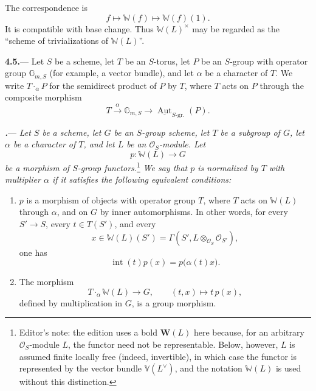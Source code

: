 The correspondence is
\[
  f\longmapsto\mathbb W(f)\longmapsto\mathbb W(f)(1).
\]
It is compatible with base change.  Thus
\(\mathbb W(L)^\times\) may be regarded as the ``scheme of
trivializations of \(\mathbb W(L)\)''.



\par\medskip\noindent
\textbf{4.5.}---
Let \(S\) be a scheme, let \(T\) be an \(S\)-torus, let \(P\) be an
\(S\)-group with operator group \(\mathbb G_{m,S}\)
\textup{(for example, a vector bundle)}, and let \(\alpha\) be a
character of \(T\).  We write \(T\mathbin{\cdot_\alpha}P\) for the
semidirect product of \(P\) by \(T\), where \(T\) acts on \(P\)
through the composite morphism
\[
  T
  \xrightarrow{\ \alpha\ }
  \mathbb G_{m,S}
  \longrightarrow
  \underline{\operatorname{Aut}}_{S\text{-gr.}}(P).
\]

\par\medskip\noindent
{}\textbf{\textit{.}}---
\textit{Let \(S\) be a scheme, let \(G\) be an \(S\)-group scheme,
let \(T\) be a subgroup of \(G\), let \(\alpha\) be a character of
\(T\), and let \(L\) be an \(\mathcal O_S\)-module.  Let}
\[
  p\colon\mathbb W(L)\longrightarrow G
\]
\textit{be a morphism of \(S\)-group functors.}\footnote{Editor's
note: the edition uses a bold \(\mathbf W(L)\) here because, for an
arbitrary \(\mathcal O_S\)-module \(L\), the functor need not be
representable.  Below, however, \(L\) is assumed finite locally free
\textup{(indeed, invertible)}, in which case the functor is
represented by the vector bundle \(\mathbb V(L^\vee)\), and the
notation \(\mathbb W(L)\) is used without this distinction.}
\textit{We say that \(p\) is \emph{normalized by \(T\) with
multiplier \(\alpha\)} if it satisfies the following equivalent
conditions:}

\begin{enumerate}
\item[\textup{(i)}]
\(p\) is a morphism of objects with operator group \(T\), where \(T\)
acts on \(\mathbb W(L)\) through \(\alpha\), and on \(G\) by inner
automorphisms.  In other words, for every \(S'\to S\), every
\(t\in T(S')\), and every
\[
  x\in\mathbb W(L)(S')
  =
  \Gamma(S',L\otimes_{\mathcal O_S}\mathcal O_{S'}),
\]
one has
\[
  \operatorname{int}(t)p(x)=p\bigl(\alpha(t)x\bigr).
\]

\item[\textup{(ii)}]
The morphism
\[
  T\mathbin{\cdot_\alpha}\mathbb W(L)\longrightarrow G,
  \qquad
  (t,x)\longmapsto t\,p(x),
\]
defined by multiplication in \(G\), is a group morphism.
\end{enumerate}

